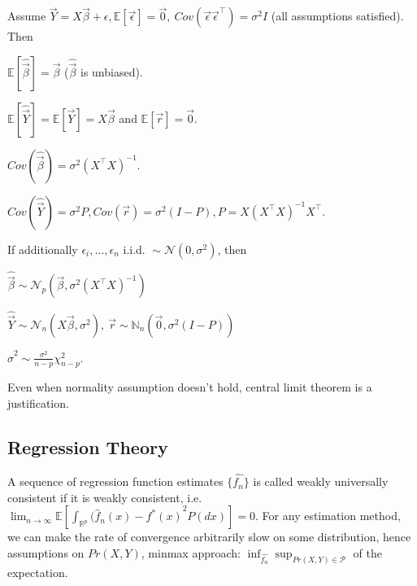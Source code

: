 \begin{notebox}\nospacing{}
  Assume $\vec{Y}=X\vec{\beta} + \epsilon, \mathbb{E}[\vec{\epsilon}]=\vec{0},\ Cov(\vec{\epsilon} \vec{\epsilon}^{\top}) = \sigma^{2}I$ (all assumptions satisfied). Then
  \begin{enumeratenosep}[label=\roman*]
    \item $\mathbb{E}[\hat{\vec{\beta}}] = \vec{\beta}$ ($\hat{\vec{\beta}}$ is unbiased).
    \item $\mathbb{E}[\hat{\vec{Y}}] = \mathbb{E}[\vec{Y}] = X\vec{\beta}$ and $\mathbb{E}[\vec{r}] = \vec{0}$.
    \item $Cov(\hat{\vec{\beta}}) = \sigma^{2}{(X^{\top}X)^{-1}}$.
    \item $Cov(\hat{\vec{Y}}) = \sigma^{2} P, Cov(\vec{r}) = \sigma^{2}(I-P), P=X(X^\top X)^{-1}X^\top$.
  \end{enumeratenosep}
  If additionally $\epsilon_{i}, \dots, \epsilon_{n} \text{ i.i.d. } \sim \mathcal{N}(0, \sigma^{2})$, then
  \begin{enumeratenosep}[label=\roman*]
    \item $\hat{\vec{\beta}} \sim \mathcal{N}_{p}{(\vec{\beta}, \sigma^{2}(X^{\top}X)^{-1})}$
    \item $\hat{\vec{Y}} \sim \mathcal{N}_{n}(X\vec{\beta}, \sigma^{2}),\ \vec{r} \sim \mathbb{N}_{n}(\vec{0}, \sigma^{2}(I-P))$
    \item $\hat \sigma^{2} \sim \frac{\sigma^{2}}{n-p}\chi^{2}_{n-p}$.
  \end{enumeratenosep}
  Even when normality assumption doesn't hold, central limit theorem is a justification.
\end{notebox}

\subsection{Regression Theory}\label{subsec:regr_theo}
\begin{sectionbox}\nospacing{}
A sequence of regression function estimates $\{\hat{f_n}\}$ is called weakly universally consistent if it is weakly consistent, i.e. $\lim_{n \to \infty}{\mathbb{E}\left[\int_{\mathbb{R}^p}{(\hat{f}_n(x) - f^{*}(x)}^2P(dx)\right]} = 0$.
For any estimation method, we can make the rate of convergence arbitrarily
slow on some distribution, hence assumptions on $Pr(X,Y)$, minmax approach: $\inf_{\hat{f_n}}\sup_{Pr(X,Y)\in\mathcal{P}}$ of the expectation.
\end{sectionbox}


